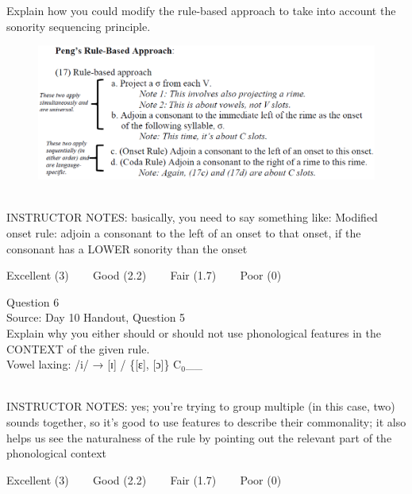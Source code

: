 \documentclass[12pt]{article}
\begin{document}
Explain how you could modify the rule-based approach to take into account the sonority sequencing principle.\\

\begin{figure}[H]
\includegraphics{../images/peng_rules.png}
\end{figure}

~\\
INSTRUCTOR NOTES: basically, you need to say something like: Modified onset rule: adjoin a consonant to the left of an onset to that onset, if the consonant has a LOWER sonority than the onset


\vfill
Excellent (3) ~~~ Good (2.2) ~~~ Fair (1.7) ~~~ Poor (0)
\newpage

{\large Question 6}\\

Source: Day 10 Handout, Question 5\\

Explain why you either should or should not use phonological features in the CONTEXT of the given rule.\\

Vowel laxing: /i/ → {[ɪ]} / \{{[ɛ]}, {[ɔ]}\} C$_0$\_\_


~\\
INSTRUCTOR NOTES: yes; you're trying to group multiple (in this case, two) sounds together, so it's good to use features to describe their commonality; it also helps us see the naturalness of the rule by pointing out the relevant part of the phonological context


\vfill
Excellent (3) ~~~ Good (2.2) ~~~ Fair (1.7) ~~~ Poor (0)
\newpage

\begin{center}
\textbf{{\color{red}{\HUGE END OF EXAM}}}\\

\end{center}
\newpage

\begin{center}
\textbf{{\color{blue}{\HUGE START OF EXAM\\}}}

\textbf{{\color{blue}{\HUGE Student ID: 9918\\}}}

\textbf{{\color{blue}{\HUGE 4:20 - 4:40 PM\\}}}

\end{center}
\newpage
\end{document}
